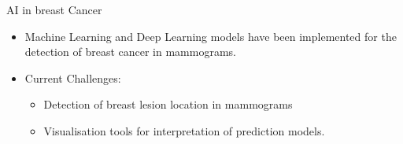 \begin{frame}{AI in breast Cancer}
    \begin{itemize}
        \item Machine Learning and Deep Learning models have been implemented for the detection of breast cancer in mammograms. 
        \item Current Challenges:
        \begin{itemize}
            \item Detection of breast lesion location in mammograms 
            \item Visualisation tools for interpretation of prediction models.
        \end{itemize}
    \end{itemize}
    
\end{frame}


